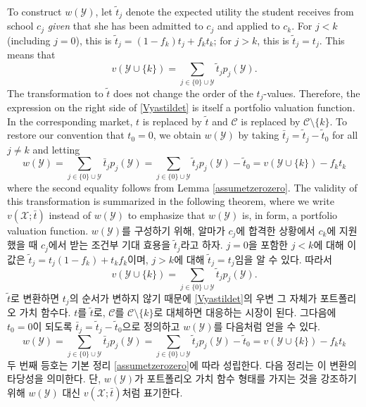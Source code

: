\documentclass[11pt]{article} %
\theoremstyle{definition}
\theoremstyle{definition}
\begin{document}
\ifen
To construct $w(\mathcal{Y})$, let $\tilde t_j$ denote the expected utility the student receives from school $c_j$ \emph{given} that she has been admitted to $c_j$ and applied to $c_k$. For $j < k$ (including $j = 0$), this is $\tilde t_j = (1- f_k) t_j + f_k t_k$; for $j > k $, this is $\tilde t_j = t_j$. This means that 
\begin{equation}\label{Vyastildet}
v(\mathcal{Y}\cup\{k\}) = \sum_{j \in \{0\} \cup \mathcal{Y}} \tilde t_j p_j(\mathcal{Y}).\end{equation}
The transformation to $\tilde t$ does not change the order of the $t_j$-values. Therefore, the expression on the right side of \eqref{Vyastildet} is itself a portfolio valuation function. In the corresponding market, $t$ is replaced by $\tilde t$ and $\mathcal{C}$ is replaced by $\mathcal{C}\setminus\{k\}$. To restore our convention that $t_0 = 0$, we obtain $w(\mathcal{Y})$ by taking $\bar t_j = \tilde t_j - \tilde t_0$ for all $j \neq k$ and letting
\begin{equation}  \label{wYvXminusconst}
w(\mathcal{Y})
= \sum_{j \in \{0\} \cup \mathcal{Y}} \bar t_j p_j(\mathcal{Y})
= \sum_{j \in \{0\} \cup \mathcal{Y}} \tilde t_j p_j(\mathcal{Y})- \tilde t_0
= v(\mathcal{Y}\cup\{k\}) -  f_k t_k \end{equation}
where the second equality follows from Lemma \ref{assumetzerozero}. The validity of this transformation is summarized in the following theorem, where we write $v(\mathcal{X}; \bar t)$ instead of $w(\mathcal{Y})$ to emphasize that $w(\mathcal{Y})$ is, in form, a portfolio valuation function. 
\else
$w(\mathcal{Y})$를 구성하기 위해, 알마가 $c_j$에 합격한 상황에서 $c_k$에 지원했을 때 $c_j$에서 받는 조건부 기대 효용을 $\tilde t_j$라고 하자. $j = 0$을 포함한 $j < k$에 대해 이값은 $\tilde t_j = t_j (1- f_k) + t_k f_k$이며, $j > k $에 대해 $\tilde t_j = t_j$임을 알 수 있다. 따라서 
\begin{equation}\label{Vyastildet}
v(\mathcal{Y}\cup\{k\}) = \sum_{j \in \{0\} \cup \mathcal{Y}} \tilde t_j p_j(\mathcal{Y}).\end{equation}
$\tilde t$로 변환하면 $t_j$의 순서가 변하지 않기 때문에 \eqref{Vyastildet}의 우변 그 자체가 포트폴리오 가치 함수다. $t$를 $\tilde t$로, $\mathcal{C}$를 $\mathcal{C}\setminus \{k\}$로 대체하면 대응하는 시장이 된다. 그다음에 $t_0 = 0$이 되도록 $\bar t_j = \tilde t_j - \tilde t_0$으로 정의하고 $w(\mathcal{Y})$를 다음처럼 얻을 수 있다. 
\begin{equation}  \label{wYvXminusconst}
w(\mathcal{Y})
= \sum_{j \in \{0\} \cup \mathcal{Y}} \bar t_j p_j(\mathcal{Y})
= \sum_{j \in \{0\} \cup \mathcal{Y}} \tilde t_j p_j(\mathcal{Y})- \tilde t_0
= v(\mathcal{Y}\cup\{k\}) -  f_k t_k \end{equation}
두 번째 등호는 기본 정리 \ref{assumetzerozero}에 따라 성립한다. 다음 정리는 이 변환의 타당성을 의미한다. 단, $w(\mathcal{Y})$가 포트폴리오 가치 함수 형태를 가지는 것을 강조하기 위해 $w(\mathcal{Y})$ 대신 $v(\mathcal{X}; \bar t)$처럼 표기한다.
\fi
\end{document}

